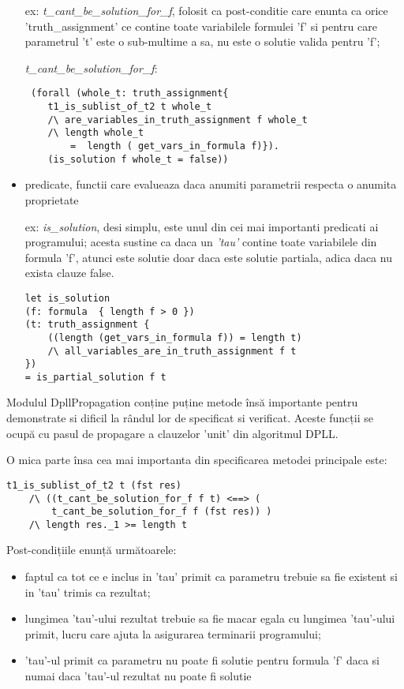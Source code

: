 \begin{itemize}
	ex: \textit{t\_cant\_be\_solution\_for\_f}, folosit ca post-conditie care enunta ca orice 'truth\_assignment' ce contine toate variabilele formulei 'f' si pentru care parametrul 't' este o sub-multime a sa, nu este o solutie valida pentru 'f';
	
	\textit{t\_cant\_be\_solution\_for\_f}:
	
	\begin{lstlisting}
 (forall (whole_t: truth_assignment{ 
	t1_is_sublist_of_t2 t whole_t
	/\ are_variables_in_truth_assignment f whole_t 
	/\ length whole_t 
		=  length ( get_vars_in_formula f)}). 
	(is_solution f whole_t = false)) 
	\end{lstlisting}
	
	
	\item predicate, functii care evalueaza daca anumiti parametrii respecta o anumita proprietate
	
	ex: \textit{is\_solution}, desi simplu, este unul din cei mai importanti predicati ai \newline programului; acesta sustine ca daca un \textit{'tau'} contine toate variabilele din formula 'f', atunci este solutie doar daca este solutie partiala, adica daca nu exista clauze false.
	
	\begin{lstlisting}
let is_solution 
(f: formula  { length f > 0 })
(t: truth_assignment {
	((length (get_vars_in_formula f)) = length t)
	/\ all_variables_are_in_truth_assignment f t  
})
= is_partial_solution f t 
	\end{lstlisting}

\end{itemize}


Modulul DpllPropagation conține puține metode însă importante pentru demonstrate si dificil la rândul lor de specificat si verificat. Aceste funcții se ocupă cu pasul de propagare a clauzelor 'unit' din algoritmul DPLL.

O mica parte însa cea mai importanta din specificarea metodei principale este:

\begin{lstlisting}[]
	t1_is_sublist_of_t2 t (fst res)
	/\ ((t_cant_be_solution_for_f f t) <==> (    
		t_cant_be_solution_for_f f (fst res)) )
 	/\ length res._1 >= length t

\end{lstlisting}
	
Post-condițiile enunță următoarele: 
\begin{itemize}
	\item  faptul ca tot ce e inclus in 'tau' primit ca parametru trebuie sa fie existent si in 'tau' trimis ca rezultat; 
	
	\item lungimea 'tau'-ului rezultat trebuie sa fie macar egala cu lungimea 'tau'-ului primit, lucru care ajuta la asigurarea terminarii programului;
	
	\item 'tau'-ul primit ca parametru nu poate fi solutie pentru formula 'f' daca si numai daca 'tau'-ul rezultat nu poate fi solutie
\end{itemize}

